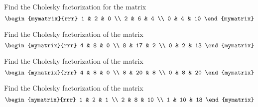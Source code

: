 \begin{enumialphparenastyle}

\begin{ex} Find the Cholesky factorization for the matrix 
\begin{equation*}
\allowbreak \begin{mymatrix}{rrr}
1 & 2 & 0 \\ 
2 & 6 & 4 \\ 
0 & 4 & 10
\end{mymatrix}
\end{equation*}
\end{ex}

\begin{ex} Find the Cholesky factorization of the matrix 
\begin{equation*}
\begin{mymatrix}{rrr}
4 & 8 & 0 \\ 
8 & 17 & 2 \\ 
0 & 2 & 13
\end{mymatrix}
\end{equation*}
\end{ex}

\begin{ex} Find the Cholesky factorization of the matrix 
\begin{equation*}
\begin{mymatrix}{rrr}
4 & 8 & 0 \\ 
8 & 20 & 8 \\ 
0 & 8 & 20
\end{mymatrix}
\end{equation*}
\end{ex}

\begin{ex} Find the Cholesky factorization of the matrix 
\begin{equation*}
\begin{mymatrix}{rrr}
1 & 2 & 1 \\ 
2 & 8 & 10 \\ 
1 & 10 & 18
\end{mymatrix}
\end{equation*}
\end{ex}


\end{enumialphparenastyle}
